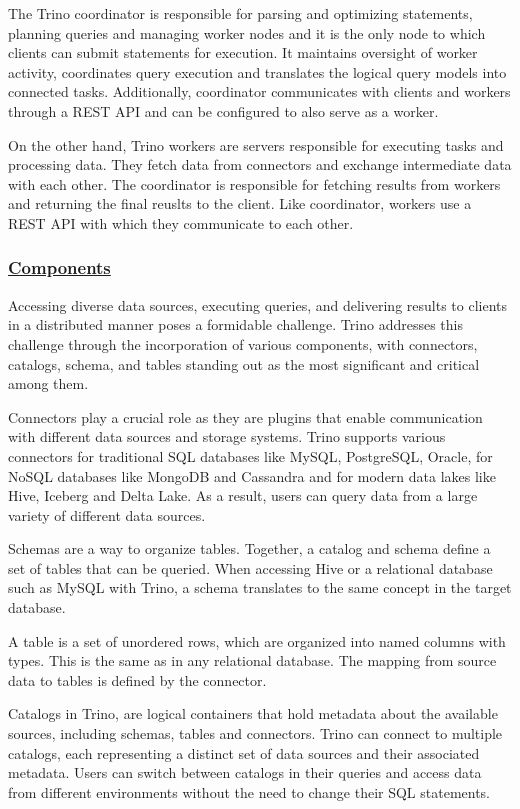 \documentclass[conference]{IEEEtran}
\begin{document}
The Trino coordinator is responsible for parsing and optimizing statements, planning queries and managing worker nodes and it is the only node to which clients can submit
statements for execution. It maintains oversight of worker activity, coordinates query execution and translates the logical query models into connected tasks. Additionally,
coordinator communicates with clients and workers through a REST API and can be configured to also serve as a worker.

On the other hand, Trino workers are servers responsible for executing tasks and processing data. They fetch data from connectors and exchange intermediate data with
each other. The coordinator is responsible for fetching results from workers and returning the final reuslts to the client. Like coordinator, workers use a REST API
with which they communicate to each other.

\subsubsection{\textbf{\underline{Components}}}
Accessing diverse data sources, executing queries, and delivering results to clients in a distributed manner poses a formidable challenge. Trino addresses this challenge through
the incorporation of various components, with connectors, catalogs, schema, and tables standing out as the most significant and critical among them.

Connectors play a crucial role as they are plugins that enable communication with different data sources and storage systems.
Trino supports various connectors for traditional SQL databases like MySQL, PostgreSQL, Oracle, for NoSQL databases like MongoDB and Cassandra and for modern data lakes like
Hive, Iceberg and Delta Lake. As a result, users can query data from a large variety of different data sources.

Schemas are a way to organize tables. Together, a catalog and schema define a set of tables that can be queried. When accessing Hive or a relational database such as MySQL with Trino,
a schema translates to the same concept in the target database.

A table is a set of unordered rows, which are organized into named columns with types. This is the same as in any relational database. The mapping from source data to tables is defined by the connector.

Catalogs in Trino, are logical containers that hold metadata about the available sources, including schemas, tables and connectors.
Trino can connect to multiple catalogs, each representing a distinct set of data sources and their associated metadata.
Users can switch between catalogs in their queries and access data from different environments without the need to change their SQL statements.
\end{document}
